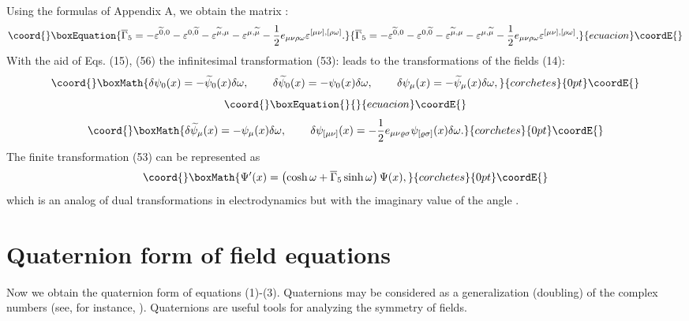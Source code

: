 \documentclass[a4paper,12pt]{article}
\begin{document}
Using the formulas of Appendix A, we obtain the matrix
\coordHE{}:
\begin{equation}\coord{}\boxEquation{
\overline{\Gamma }_5=-\varepsilon ^{\widetilde{0},0}-\varepsilon
^{0,\widetilde{0}}-\varepsilon ^{\widetilde{\mu },\mu
}-\varepsilon ^{{\mu },\widetilde{\mu}}-\frac 12 e_{\mu \nu \rho
\omega }\varepsilon ^{[\mu \nu],[\rho \omega ]} . \label{56}
}{
\overline{\Gamma }_5=-\varepsilon ^{\widetilde{0},0}-\varepsilon
^{0,\widetilde{0}}-\varepsilon ^{\widetilde{\mu },\mu
}-\varepsilon ^{{\mu },\widetilde{\mu}}-\frac 12 e_{\mu \nu \rho
\omega }\varepsilon ^{[\mu \nu],[\rho \omega ]} . }{ecuacion}\coordE{}\end{equation}
With the aid of Eqs. (15), (56) the infinitesimal transformation
(53): \coordHE{}
leads to the transformations of the fields (14):
\[\coord{}\boxMath{
\delta \psi_0 (x)=-\widetilde{\psi}_0 (x)\delta\omega
,\hspace{0.3in}\delta \widetilde{\psi}_0 (x)=-\psi_0
(x)\delta\omega , \hspace{0.3in} \delta \psi_\mu
(x)=-\widetilde{\psi}_\mu (x)\delta\omega ,
}{corchetes}{0pt}\coordE{}\]
\vspace{-7mm}
\begin{equation}\coord{}\boxEquation{
\label{57}
}{
}{ecuacion}\coordE{}\end{equation}
\vspace{-7mm}
\[\coord{}\boxMath{
\delta \widetilde{\psi}_\mu (x)=-\psi_\mu (x)\delta\omega
,\hspace{0.3in} \delta
\psi_{[\mu\nu]}(x)=-\frac{1}{2}e_{\mu\nu\varrho\sigma}
\psi_{[\varrho\sigma]}(x)\delta\omega .
}{corchetes}{0pt}\coordE{}\]
The finite transformation (53) can be represented as
\[\coord{}\boxMath{
 \Psi'(x)=\left(\cosh \omega + \overline{\Gamma }_5
 \sinh \omega \right)\Psi (x) ,
}{corchetes}{0pt}\coordE{}\]
which is an analog of dual transformations in electrodynamics but
with the imaginary value of the angle \myHighlight{$\omega$}\coordHE{} \cite{monogr}.

\section{Quaternion form of field equations}

Now we obtain the quaternion form of equations (1)-(3).
Quaternions may be considered as a generalization (doubling) of
the complex numbers (see, for instance, \cite{Casanova}).
Quaternions are useful tools for analyzing the symmetry of fields.
\end{document}
